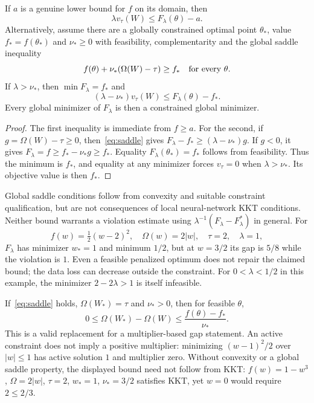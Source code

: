 \begin{proposition}\label{prop:penalty}
If $a$ is a genuine lower bound for $f$ on its domain, then
\begin{equation}\label{eq:penalty_lower}
 \lambda v_\tau(W)\le F_\lambda(\theta)-a.
\end{equation}
Alternatively, assume there are a globally constrained optimal point $\theta_*$, value $f_*=f(\theta_*)$ and $\nu_*\ge0$ with feasibility, complementarity and the global saddle inequality
\begin{equation}\label{eq:saddle}
 f(\theta)+\nu_*(\Omega(W)-\tau)\ge f_*\quad\hbox{for every }\theta.
\end{equation}
If $\lambda>\nu_*$, then $\min F_\lambda=f_*$ and
\begin{equation}\label{eq:penalty_saddle}
 (\lambda-\nu_*)v_\tau(W)\le F_\lambda(\theta)-f_*.
\end{equation}
Every global minimizer of $F_\lambda$ is then a constrained global minimizer.
\end{proposition}
\begin{proof}
The first inequality is immediate from $f\ge a$. For the second, if $g=\Omega(W)-\tau\ge0$, then~\eqref{eq:saddle} gives $F_\lambda-f_*\ge(\lambda-\nu_*)g$. If $g<0$, it gives $F_\lambda=f\ge f_*-\nu_*g\ge f_*$. Equality $F_\lambda(\theta_*)=f_*$ follows from feasibility. Thus the minimum is $f_*$, and equality at any minimizer forces $v_\tau=0$ when $\lambda>\nu_*$. Its objective value is then $f_*$.
\end{proof}
Global saddle conditions follow from convexity and suitable constraint qualification, but are not consequences of local neural-network KKT conditions. Neither bound warrants a violation estimate using $\lambda^{-1}(F_\lambda-F_\lambda^*)$ in general. For
\[
 f(w)=\tfrac12(w-2)^2,\quad\Omega(w)=2|w|,\quad\tau=2,\quad\lambda=1,
\]
$F_\lambda$ has minimizer $w_*=1$ and minimum $1/2$, but at $w=3/2$ its gap is $5/8$ while the violation is $1$. Even a feasible penalized optimum does not repair the claimed bound; the data loss can decrease outside the constraint. For $0<\lambda<1/2$ in this example, the minimizer $2-2\lambda>1$ is itself infeasible.

If~\eqref{eq:saddle} holds, $\Omega(W_*)=\tau$ and $\nu_*>0$, then for feasible $\theta$,
\[
 0\le\Omega(W_*)-\Omega(W)\le\frac{f(\theta)-f_*}{\nu_*}.
\]
This is a valid replacement for a multiplier-based gap statement. An active constraint does not imply a positive multiplier: minimizing $(w-1)^2/2$ over $|w|\le1$ has active solution $1$ and multiplier zero. Without convexity or a global saddle property, the displayed bound need not follow from KKT: $f(w)=1-w^3$, $\Omega=2|w|$, $\tau=2$, $w_*=1$, $\nu_*=3/2$ satisfies KKT, yet $w=0$ would require $2\le2/3$.

